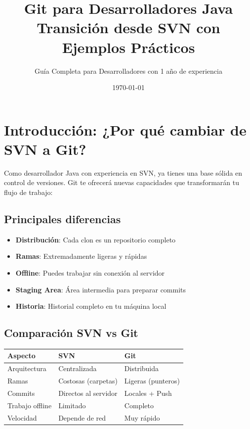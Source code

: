 \documentclass[12pt,a4paper]{article}
\title{{\Huge \textbf{Git para Desarrolladores Java}} \\ 
       {\Large Transición desde SVN con Ejemplos Prácticos}}
\author{Guía Completa para Desarrolladores con 1 año de experiencia}
\date{\today}
\begin{document}
\maketitle

\tableofcontents
\newpage

\section{Introducción: ¿Por qué cambiar de SVN a Git?}

Como desarrollador Java con experiencia en SVN, ya tienes una base sólida en control de versiones. Git te ofrecerá nuevas capacidades que transformarán tu flujo de trabajo:

\subsection{Principales diferencias}
\begin{itemize}
    \item \textbf{Distribución}: Cada clon es un repositorio completo
    \item \textbf{Ramas}: Extremadamente ligeras y rápidas
    \item \textbf{Offline}: Puedes trabajar sin conexión al servidor
    \item \textbf{Staging Area}: Área intermedia para preparar commits
    \item \textbf{Historia}: Historial completo en tu máquina local
\end{itemize}

\subsection{Comparación SVN vs Git}

\begin{center}
\begin{tabular}{|l|l|l|}
\hline
\textbf{Aspecto} & \textbf{SVN} & \textbf{Git} \\
\hline
Arquitectura & Centralizada & Distribuida \\
Ramas & Costosas (carpetas) & Ligeras (punteros) \\
Commits & Directos al servidor & Locales + Push \\
Trabajo offline & Limitado & Completo \\
Velocidad & Depende de red & Muy rápido \\
\hline
\end{tabular}
\end{center}
\end{document}
